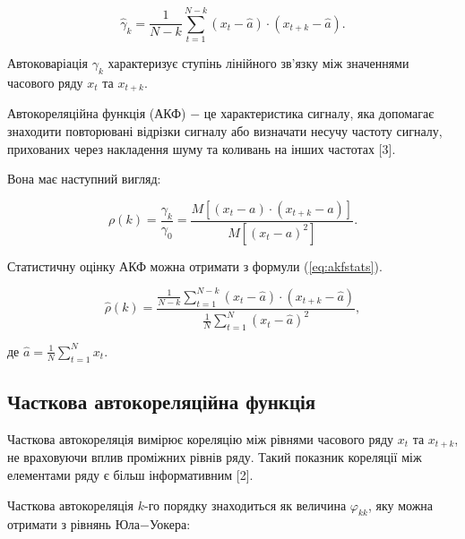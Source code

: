 \begin{equation}\label{eq:stats}
\hat{\gamma}_{k} = \frac{1}{N-k}\sum^{N-k}_{t=1}(x_{t} - \hat{a}) \cdot (x_{t+k} - \hat{a}).
\end{equation}

\vspace{1.5em}

Автоковаріація $\gamma_{k}$ характеризує ступінь лінійного зв'язку між значеннями часового ряду $x_{t}$ та $x_{t+k}$.

Автокореляційна функція (АКФ) $-$ це характеристика сигналу, яка допомагає знаходити повторювані відрізки сигналу або визначати несучу частоту сигналу, прихованих через накладення шуму та коливань на інших частотах [3].

Вона має наступний вигляд:

\begin{equation}\label{eq:akf}
\rho(k) = \frac{\gamma_{k}}{\gamma_{0}} = \frac{M[(x_{t} - a) \cdot (x_{t+k} - a)]}{M[(x_{t} - a)^{2}]}.
\end{equation}

\vspace{1.5em}

Статистичну оцінку АКФ можна отримати з формули (\ref{eq:akfstats}).

\begin{equation}\label{eq:akfstats}
\hat{\rho}(k) = \frac{\frac{1}{N-k}\sum^{N-k}_{t=1}(x_{t} - \hat{a}) \cdot (x_{t+k} - \hat{a})}{\frac{1}{N}\sum^{N}_{t=1}(x_{t} - \hat{a})^{2}},
\end{equation}

\noindent де $\hat{a} = \frac{1}{N}\sum^{N}_{t=1}x_{t}$.

\subsection{Часткова автокореляційна функція}

Часткова автокореляція вимірює кореляцію між рівнями часового ряду $x_{t}$ та $x_{t+k}$, не враховуючи вплив проміжних рівнів ряду. Такий показник кореляції між елементами ряду є більш інформативним [2].

Часткова автокореляція $k$-го порядку знаходиться як величина $\varphi_{kk}$, яку можна отримати з рівнянь Юла$-$Уокера:

